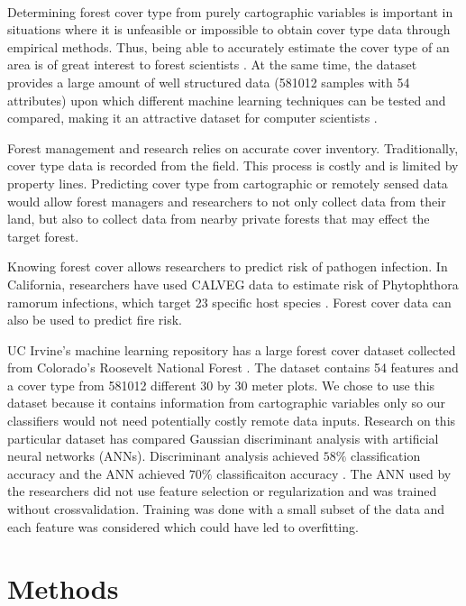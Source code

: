 \documentclass[11pt]{article}
\begin{document}
\paragraph{}
Determining forest cover type from purely cartographic variables is important in situations where it is unfeasible or impossible to obtain cover type data through empirical methods. Thus, being able to accurately estimate the cover type of an area is of great interest to forest scientists \cite{blackard00}.  At the same time, the dataset provides a large amount of well structured data (581012 samples with 54 attributes) upon which different machine learning techniques can be tested and compared, making it an attractive dataset for computer scientists \cite{gama03,oza01,giannella,furnkranz,obradovic,klami}.
\par
Forest management and research relies on accurate cover inventory.  Traditionally, cover type data is recorded from the field.  This process is costly and is limited by property lines.  Predicting cover type from cartographic or remotely sensed data would allow forest managers and researchers to not only collect data from their land, but also to collect data from nearby private forests that may effect the target forest.
\par
Knowing forest cover allows researchers to predict risk of pathogen infection.  In California, researchers have used CALVEG data to estimate risk of Phytophthora ramorum infections, which target 23 specific host species \cite{ross04}.  Forest cover data can also be used to predict fire risk.
\par
UC Irvine's machine learning repository has a large forest cover dataset collected from Colorado's Roosevelt National Forest \cite{bache13}.  The dataset contains 54 features and a cover type from 581012 different 30 by 30 meter plots.  We chose to use this dataset because it contains information from cartographic variables only so our classifiers would not need potentially costly remote data inputs. Research on this particular dataset has compared Gaussian discriminant analysis with artificial neural networks (ANNs).  Discriminant analysis achieved $58\%$ classification accuracy and the ANN achieved $70\%$ classificaiton accuracy \cite{jock99}.  The ANN used by the researchers did not use feature selection or regularization and was trained without crossvalidation.  Training was done with a small subset of the data and each feature was considered which could have led to overfitting.

\section{Methods}
\end{document}
